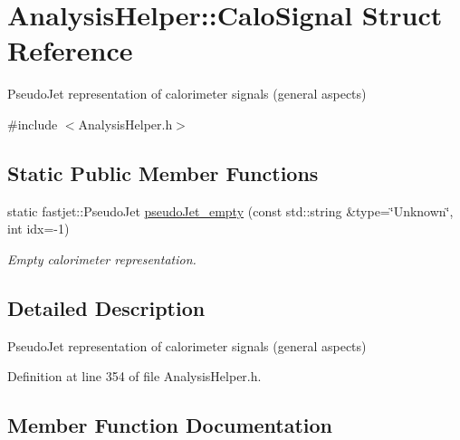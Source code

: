 \hypertarget{structAnalysisHelper_1_1CaloSignal}{}\section{Analysis\+Helper\+:\+:Calo\+Signal Struct Reference}
\label{structAnalysisHelper_1_1CaloSignal}


Pseudo\+Jet representation of calorimeter signals (general aspects)  




{\ttfamily \#include $<$Analysis\+Helper.\+h$>$}

\subsection*{Static Public Member Functions}
\begin{DoxyCompactItemize}
\item 
static fastjet\+::\+Pseudo\+Jet \hyperlink{structAnalysisHelper_1_1CaloSignal_ab4ce44c3cfe610566436ddb55e92d4ea}{pseudo\+Jet\+\_\+empty} (const std\+::string \&type=\char`\"{}Unknown\char`\"{}, int idx=-\/1)
\begin{DoxyCompactList}\small\item\em Empty calorimeter representation. \end{DoxyCompactList}\end{DoxyCompactItemize}


\subsection{Detailed Description}
Pseudo\+Jet representation of calorimeter signals (general aspects) 

Definition at line 354 of file Analysis\+Helper.\+h.



\subsection{Member Function Documentation}
